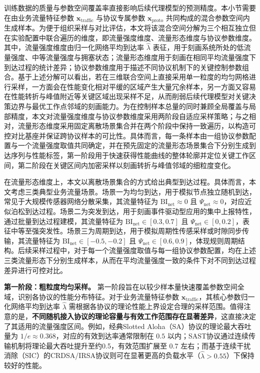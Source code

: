 训练数据的质量与参数空间覆盖率直接影响后续代理模型的预测精度。本小节需要在由业务流量特征参数 $\mathbf{x}_{\text{traffic}}$ 与协议专属参数 $\mathbf{x}_{\mathrm{proto}}$ 共同构成的混合参数空间内生成样本。为便于组织采样与对比评估，本文将该混合空间分解为三个相互独立但在实验配置中联合遍历的维度，即流量强度维度、流量形态维度与协议参数维度。其中，流量强度维度由归一化网络平均到达率 $\hat{\lambda}$ 表征，用于刻画系统所处的低流量强度、中等流量强度与拥塞状态；流量形态维度用于刻画在相同平均流量强度下到达过程的统计差异；协议参数维度用于描述不同协议机制下的关键控制参数组合。基于上述分解可以看出，若在三维联合空间上直接采用单一粒度的均匀网格进行采样，一方面会在性能变化相对平缓的区域产生大量冗余样本，另一方面又容易在性能转折与峰值附近等关键区域出现采样不足，从而削弱后续代理模型对关键决策边界与最优工作点邻域的刻画能力。为在控制样本总量的同时兼顾全局覆盖与局部精度，本文对流量强度维度与协议参数维度采用两阶段自适应采样策略；与之相对，流量形态维度采用固定离散场景集合并在两个阶段中保持一致遍历，以构造可控对比基座并保证跨协议样本的可比性。具体而言，每一条样本由一组协议参数配置与一个流量强度取值共同确定，并在预先固定的流量形态场景集合下分别生成到达序列与性能标签，第一阶段用于快速获得性能曲线的整体轮廓并定位关键工作区间，第二阶段在关键区间内加密采样以刻画转折与峰值邻域的细粒度变化。

在流量形态维度上，本文以离散场景集合的方式给出典型到达过程。具体而言，本文考虑三类典型业务流量场景。场景一为均匀到达，用于模拟节点独立随机到达，常见于大规模传感器网络分散采集，其流量特征为 $\mathrm{BI}_{\mathrm{net}} \approx 0$ 且 $\Psi_{\mathrm{net}} \approx 0$，对应近似泊松到达过程。场景二为突发到达，用于刻画事件驱动型应用的集中上报特性，通过批量到达过程建模，其流量特征为 $\mathrm{BI}_{\mathrm{net}} \in [0.3, 0.7]$ 且 $\Psi_{\mathrm{net}} \in [0, 0.2]$，表征中等至强突发性。场景三为周期到达，用于模拟周期性传感采样或时隙同步传输，其流量特征为 $\mathrm{BI}_{\mathrm{net}} \in [-0.5, -0.2]$ 且 $\Psi_{\mathrm{net}} \in [0.6, 0.9]$，体现规则周期结构。后续采样过程中，对于每一个流量强度取值与每一组协议参数配置，均在上述三类流量形态下分别生成样本，从而在平均流量强度一致的条件下对不同到达过程差异进行可控对比。







\textbf{第一阶段：粗粒度均匀采样。}
第一阶段旨在以较少样本量快速覆盖参数空间全域，识别各协议的性能分布特征。对于业务流量特征参数 $\mathbf{x}_{\text{traffic}}$，其核心参数归一化网络平均到达率 $\hat{\lambda}$ 需根据各协议的理论性能上界设定合理的采样范围。值得注意的是，\textbf{不同随机接入协议的理论容量与有效工作范围存在显著差异}，这直接决定了其适用的流量强度区间。例如，经典Slotted Aloha（SA）协议的理论最大吞吐量为 $1/e \approx 0.368$，对应的有效到达率通常限制在 $0.5$ 以内；SAST协议通过连续传输机制将理论最大吞吐提升至约0.5，有效范围扩展至 $0.7$ 左右；而基于连续干扰消除（SIC）的CRDSA/IRSA协议则可在显著更高的负载水平（$\hat{\lambda} > 0.55$）下保持较好的性能。


